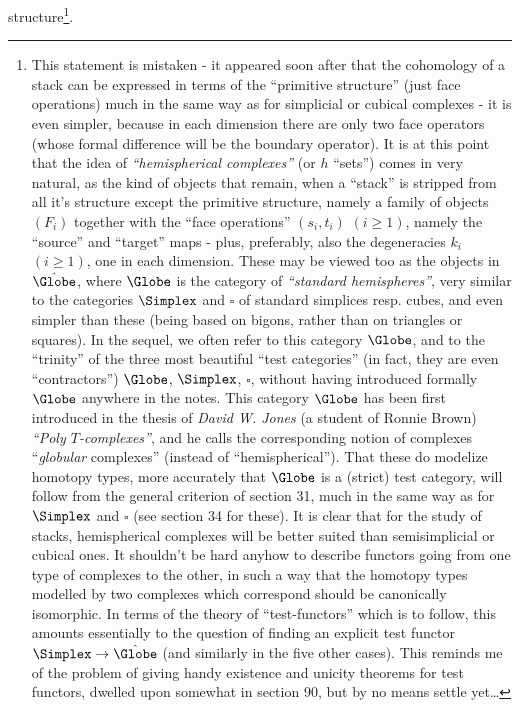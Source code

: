 structure\footnote{This statement is mistaken - it appeared soon after that the cohomology of a stack can be expressed in terms of the ``primitive structure'' (just face operations) much in the same way as for simplicial or cubical complexes - it is even simpler, because in each dimension there are only two face operators (whose formal difference will be the boundary operator). It is at this point that the idea of \emph{``hemispherical complexes''} (or $h$ ``sets'') comes in very natural, as the kind of objects that remain, when a ``stack'' is stripped from all it's structure except the primitive structure, namely a family of objects $(F_i)$ together with the ``face operations'' $(s_i, t_i)$ $(i \geq 1)$, namely the ``source'' and ``target'' maps - plus, preferably, also the degeneracies $k_i$ $(i \geq 1)$, one in each dimension. These may be viewed too as the objects in $\hat{\Globe}$, where $\Globe$ is the category of \emph{``standard hemispheres''}, very similar to the categories $\Simplex$ and $\square$ of standard simplices resp. cubes, and even simpler than these (being based on bigons, rather than on triangles or squares). In the sequel, we often refer to this category $\Globe$, and to the ``trinity'' of the three most beautiful ``test categories'' (in fact, they are even ``contractors'') $\Globe$, $\Simplex$, $\square$, without having introduced formally $\Globe$ anywhere in the notes. This category $\Globe$ has been first introduced in the thesis of \emph{David W. Jones} (a student of Ronnie Brown) \emph{``Poly $T$-complexes''}, and he calls the corresponding notion of complexes ``\emph{globular} complexes'' (instead of ``hemispherical''). That these do modelize homotopy types, more accurately that $\Globe$ is a (strict) test category, will follow from the general criterion of section 31, much in the same way as for $\Simplex$ and $\square$ (see section 34 for these). It is clear that for the study of stacks, hemispherical complexes will be better suited than semisimplicial or cubical ones. It shouldn't be hard anyhow to describe functors going from one type of complexes to the other, in such a way that the homotopy types modelled by two complexes which correspond should be canonically isomorphic. In terms of the theory of ``test-functors'' which is to follow, this amounts essentially to the question of finding an explicit test functor $\Simplex \to \hat{\Globe}$ (and similarly in the five other cases). This reminds me of the problem of giving handy existence and unicity theorems for test functors, dwelled upon somewhat in section 90, but by no means settle yet\dots}. 

